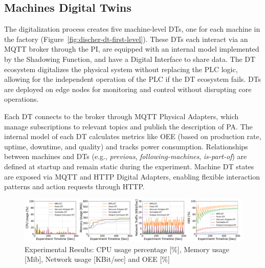 


\subsection{Machines Digital Twins}
\label{subsec:dt-machine-level} 

The digitalization process creates five machine-level DTs, one for each machine in the factory (Figure~\ref{fig:discher-dt-first-level}). These DTs each interact via an MQTT broker through the PI, are equipped with an internal model implemented by the Shadowing Function, and have a Digital Interface to share data.
The DT ecosystem digitalizes the physical system without replacing the PLC logic, allowing for the independent operation of the PLC if the DT ecosystem fails.
DTs are deployed on edge nodes for monitoring and control without disrupting core operations.

Each DT connects to the broker through MQTT Physical Adapters, which manage subscriptions to relevant topics and publish the description of PA. The internal model of each DT calculates metrics like OEE (based on production rate, uptime, downtime, and quality) and tracks power consumption. Relationships between machines and DTs (e.g., \emph{previous}, \emph{following-machines}, \emph{is-part-of}) are defined at startup and remain static during the experiment.
Machine DT states are exposed via MQTT and HTTP Digital Adapters, enabling flexible interaction patterns and action requests through HTTP.

\begin{figure}
    \setlength{\belowcaptionskip}{-13pt}
    \centering
    \includegraphics[width=\textwidth]{figures/engineering-wldt/experimental_results.pdf}
    \caption{Experimental Results: CPU usage percentage [\%], Memory usage [Mib], Network usage [KBit/sec] and OEE [\%]}
    \label{fig:exp-results}
\end{figure}

